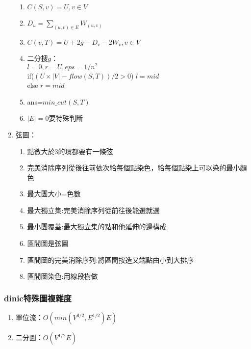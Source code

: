 \begin{enumerate}
\begin{enumerate}
	\item $C(S,v)=U ,v \in V$
	\item $D_u=\sum_{(u,v) \in E} W_{(u,v)}$
	\item $C(v,T)=U+2g-D_v-2W_v ,v \in V$
	\item 二分搜$g$：\\$l=0,r=U,eps=1/n^2$\\if($(U\times|V|-flow(S,T))/2>0$) $l=mid$\\else $r=mid$
	\item ans=$min\_cut(S,T)$
	\item $|E|=0$要特殊判斷
	\end{enumerate}
\item 弦圖：
	\begin{enumerate}\itemsep = -3pt
	\item 點數大於3的環都要有一條弦
	\item 完美消除序列從後往前依次給每個點染色，給每個點染上可以染的最小顏色
	\item 最大團大小=色數
	\item 最大獨立集:完美消除序列從前往後能選就選
	\item 最小團覆蓋:最大獨立集的點和他延伸的邊構成
	\item 區間圖是弦圖
	\item 區間圖的完美消除序列:將區間按造又端點由小到大排序
	\item 區間圖染色:用線段樹做
	\end{enumerate}
\end{enumerate}
\subsubsection{dinic特殊圖複雜度}
\begin{enumerate}\itemsep = -5pt
\item 單位流：$O\left(min\left(V^{3/2},E^{1/2}\right)E\right)$
\item 二分圖：$O\left(V^{1/2}E\right)$
\end{enumerate}


